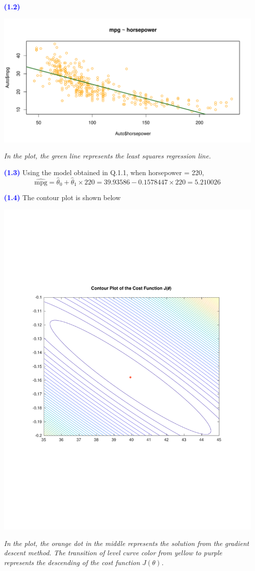 \documentclass[a4paper,12pt]{article}
\newcommand{\qnum}[1]{\noindent\textcolor{blue}{\textbf{(#1)}}}
\newcommand{\tx}[1]{\text{#1}}
\begin{document}
\qnum{1.2}
\begin{center}
    \includegraphics[width=0.9\linewidth]{Images/Prob1-2.pdf}
  
    \parbox{0.9\textwidth}{\textit{
    In the plot, the \textcolor{mydarkgreen}{green line} represents the least squares regression line.
    }}
\end{center}


\qnum{1.3}
Using the model obtained in Q.1.1, when horsepower = 220,
\[
    \hat{\tx{mpg}} = \hat\theta_0 + \hat\theta_1\times 220
    = 39.93586 -0.1578447 \times 220
    = 5.210026
\]






\qnum{1.4}
The contour plot is shown below
\begin{center}
    \includegraphics[width=0.9\linewidth, trim={0 6.5cm 0 6cm}]{Images/Prob1-4-Contour.pdf}
  
    \parbox{0.65\textwidth}{\textit{In the plot, the \textcolor{myorange}{orange dot} in the middle represents the solution from the gradient descent method. The transition of level curve color from yellow to purple represents the descending of the cost function $J(\theta)$.
    }}
\end{center}
\bigskip\bigskip
\end{document}

